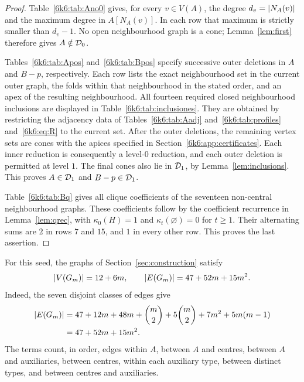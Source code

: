 \begin{proof}
Table~\ref{6k6:tab:Ano0} gives, for every \(v\in V(A)\), the degree
\(d_v=\lvert N_A(v)\rvert\) and the maximum degree in \(A[N_A(v)]\).
In each row that maximum is strictly smaller than \(d_v-1\).
No open neighbourhood graph is a cone; Lemma~\ref{lem:first}
therefore gives \(A\notin\mathcal D_0\).

Tables~\ref{6k6:tab:Apos} and~\ref{6k6:tab:Bpos} specify successive outer
deletions in \(A\) and \(B-p\), respectively. Each row lists the
exact neighbourhood set in the current outer graph, the folds
within that neighbourhood in the stated order, and an apex of
the resulting neighbourhood. All fourteen required closed
neighbourhood inclusions are displayed in Table~\ref{6k6:tab:inclusiones}.
They are obtained by restricting the adjacency data of
Tables~\ref{6k6:tab:Aadj} and~\ref{6k6:tab:profiles} and~\eqref{6k6:eq:R} to the
current set. After the outer deletions, the remaining vertex sets
are cones with the apices specified in Section~\ref{6k6:app:certificates}.
Each inner reduction is consequently a level-\(0\) reduction, and
each outer deletion is permitted at level \(1\).
The final cones also lie in \(\mathcal D_1\), by Lemma~\ref{lem:inclusions}.
This proves \(A\in\mathcal D_1\) and \(B-p\in\mathcal D_1\).

Table~\ref{6k6:tab:Bq} gives all clique coefficients of the seventeen
non-central neighbourhood graphs. These coefficients follow by
the coefficient recurrence in Lemma~\ref{lem:qrec}, with
\(\kappa_0(H)=1\) and \(\kappa_t(\varnothing)=0\) for \(t\geq1\).
Their alternating sums are \(2\) in rows \(7\) and \(15\), and
\(1\) in every other row. This proves the last assertion.
\end{proof}

For this seed, the graphs of Section~\ref{sec:construction} satisfy
\begin{equation}\label{6k6:eq:concrete-order}
 \lvert V(G_m)\rvert=12+6m,\qquad
 \lvert E(G_m)\rvert=47+52m+15m^2 .
\end{equation}
Indeed, the seven disjoint classes of edges give
\[
\begin{aligned}
 \lvert E(G_m)\rvert
 &=47+12m+48m+\binom m2+5\binom m2+7m^2+5m(m-1)\\
 &=47+52m+15m^2.
\end{aligned}
\]
The terms count, in order, edges within \(A\), between \(A\) and
centres, between \(A\) and auxiliaries, between centres, within
each auxiliary type, between distinct types, and between centres
and auxiliaries.

